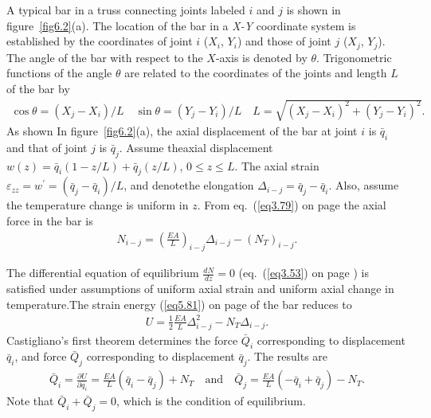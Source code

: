 \documentclass{AeroStructure-ERJohnson}
\begin{document}
A typical bar in a truss connecting joints labeled $i$ and $j$ is shown in figure~\ref{fig6.2}(a). The location of the bar in a \textit{X-Y} coordinate system is established by the coordinates of joint $i$ ($X_{i}$, $Y_{i}$) and those of joint $j$ ($X_{j}$, $Y_{j}$). The angle of the bar with respect to the $X$-axis is denoted by $\theta$. Trigonometric functions of the angle $\theta$ are related to the coordinates of the joints and length $L$ of the bar by
\begin{align}\label{eq6.1}
\cos \theta=\left(X_{j}-X_{i}\right) / L \quad \sin \theta=\left(Y_{j}-Y_{i}\right) / L \quad L=\sqrt{\left(X_{j}-X_{i}\right)^{2}+\left(Y_{j}-Y_{i}\right)^{2}}.
\end{align}
As shown In figure~\ref{fig6.2}(a), the axial displacement of the bar at joint $i$ is $\bar{q}_{i}$ and that of joint $j$ is $\bar{q}_{j}$. Assume the\break axial displacement $w(z)=\bar{q}_{i}(1-z / L)+\bar{q}_{j}(z / L)$, $0 \leq z \leq L$. The axial strain $\varepsilon_{z z}=w^{\prime}=\left(\bar{q}_{j}-\bar{q}_{i}\right) / L$, and denote\break the elongation $\Delta_{i-j}=\bar{q}_{j}-\bar{q}_{i}$. Also, assume the temperature change is uniform in $z$. From eq.~(\ref{eq3.79}) on page \pageref{eq3.79} the axial force in the bar is
\begin{align}\label{eq6.2}
N_{i-j}=\left(\frac{E A}{L}\right)_{i-j} \Delta_{i-j}-\left(N_{T}\right)_{i-j}.
\end{align}


\vspace*{-1pc}

\noindent The differential equation of equilibrium $\frac{dN}{dz}=0$ (eq.~(\ref{eq3.53}) on page \pageref{eq3.53}) is satisfied under assumptions of uniform axial strain and uniform axial change in temperature.The strain energy (\ref{eq5.81}) on page \pageref{eq5.81} of the bar reduces to
\begin{align}\label{eq6.3}
U=\frac{1}{2} \frac{E A}{L} \Delta_{i-j}^{2}-N_{T} \Delta_{i-j}.
\end{align}
Castigliano's first theorem determines the force $\bar{Q}_{i}$ corresponding to displacement $\bar{q}_{i}$, and force $\bar{Q}_{j}$ corresponding to displacement $\bar{q}_{j}$. The results are
\begin{align}\label{eq6.4}
\bar{Q}_{i}=\frac{\partial U}{\partial \bar{q}_{i}}=\frac{E A}{L}\left(\bar{q}_{i}-\bar{q}_{j}\right)+N_{T}\quad \text{and}\quad \bar{Q}_{j}=\frac{E A}{L}\left(-\bar{q}_{i}+\bar{q}_{j}\right)-N_{T}.
\end{align}
Note that $\bar{Q}_{i}+\bar{Q}_{j}=0$, which is the condition of equilibrium.
\end{document}
